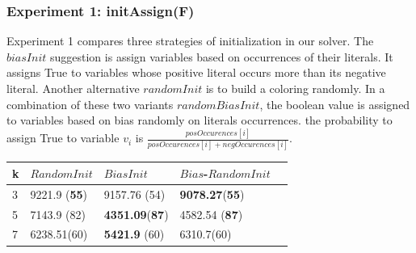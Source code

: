 \documentclass[12pt,a4paper,twoside]{scrartcl}
\numberwithin{equation}{section}
\begin{document}
\subsubsection{Experiment 1: initAssign(F)}
\label{sec:Experiment 1}
Experiment 1 compares three strategies of initialization in our solver. The $biasInit$ suggestion is assign variables based on occurrences of their literals. It assigns True to variables whose positive literal occurs more than its negative literal. Another alternative $randomInit$ is to build a coloring randomly. In a combination of these two variants $randomBiasInit$, the boolean value is assigned to variables based on bias randomly on literals occurrences. the probability to assign True to variable $v_i$ is $\frac{posOccurences[i]}{posOccurences[i]+negOccurences[i]}$. \\
\begin{table}[H]
\label{tab:com}
\begin{center}
    \begin{tabular}{|l|l|l|l|p{1cm}|}
\hline 
    k &$RandomInit$&$BiasInit$&$Bias$-$RandomInit$ \\ \hline
	3&9221.9 (\textbf{55})&9157.76 (54)&\textbf{ 9078.27}(\textbf{55}) \\ \hline
	5&7143.9 (82)&\textbf{4351.09}(\textbf{87})&4582.54 (\textbf{87})\\ \hline

	7& 	6238.51(60)&\textbf{5421.9} (60)& 6310.7(60)\\ \hline
	
\end{tabular}
\end{center}
\end{table} 
\end{document}
